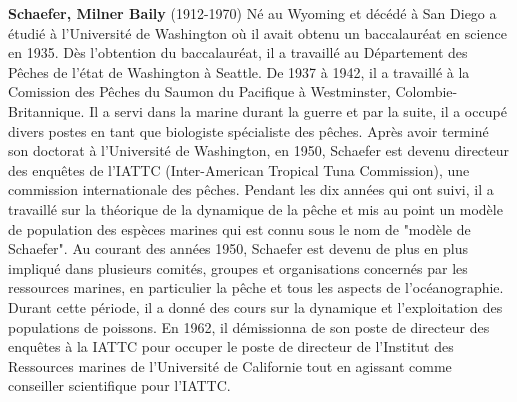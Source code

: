 \textbf{Schaefer, Milner Baily} (1912-1970) Né au Wyoming et décédé à San Diego a étudié à l'Université de Washington où il avait obtenu un baccalauréat en science en 1935. Dès l'obtention du baccalauréat, il a travaillé au Département des Pêches de l'état de Washington à Seattle. De 1937 à 1942, il a travaillé à la Comission des Pêches du Saumon du Pacifique à Westminster, Colombie-Britannique. Il a servi dans la marine durant la guerre et par la suite, il a occupé divers postes en tant que biologiste spécialiste des pêches. Après avoir terminé son doctorat à l'Université de Washington, en 1950, Schaefer est devenu directeur des enquêtes de l'IATTC (Inter-American Tropical Tuna Commission), une commission internationale des pêches. Pendant les dix années qui ont suivi, il a travaillé sur la théorique de la dynamique de la pêche et mis au point un modèle de population des espèces marines qui est connu sous le nom de "modèle de Schaefer". Au courant des années 1950, Schaefer est devenu de plus en plus impliqué dans plusieurs comités, groupes et organisations concernés par les ressources marines, en particulier la pêche et tous les aspects de l'océanographie. Durant cette période, il a donné des cours sur la dynamique et l'exploitation des populations de poissons. En 1962, il démissionna de son poste de directeur des enquêtes à la IATTC pour occuper le poste de directeur de l'Institut des Ressources marines de l'Université de Californie tout en agissant comme conseiller scientifique pour l'IATTC.


